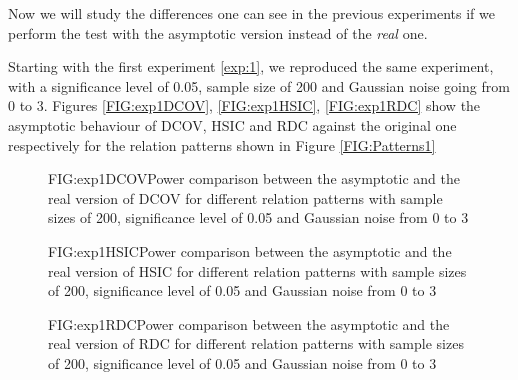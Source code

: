 Now we will study the differences one can see in the previous experiments if we perform the test with the asymptotic version instead of the \textit{real} one.

Starting with the first experiment \ref{exp:1}, we reproduced the same experiment, with a significance level of 0.05, sample size of 200 and Gaussian noise going from 0 to 3. Figures \ref{FIG:exp1DCOV}, \ref{FIG:exp1HSIC}, \ref{FIG:exp1RDC} show the asymptotic behaviour of DCOV, HSIC and RDC against the original one respectively for the relation patterns shown in Figure \ref{FIG:Patterns1}
\FloatBarrier
\begin{figure}[Experiment 1 DCOV asymptotic vs real]{FIG:exp1DCOV}{Power comparison between the asymptotic and the real version of DCOV for different relation patterns with sample sizes of 200, significance level of 0.05 and Gaussian noise from 0 to 3}
\end{figure}
\begin{figure}[Experiment 1 HSIC asymptotic vs real]{FIG:exp1HSIC}{Power comparison between the asymptotic and the real version of HSIC for different relation patterns with sample sizes of 200, significance level of 0.05 and Gaussian noise from 0 to 3}
\end{figure}
\begin{figure}[Experiment 1 RDC asymptotic vs real]{FIG:exp1RDC}{Power comparison between the asymptotic and the real version of RDC for different relation patterns with sample sizes of 200, significance level of 0.05 and Gaussian noise from 0 to 3}
\end{figure}
\FloatBarrier

